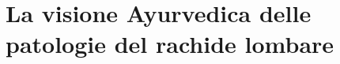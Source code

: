 \documentclass[a4paper, openright, twoside, 12pt]{book}
\begin{document}
\part{La visione Ayurvedica delle patologie del rachide lombare}

































\end{document}
